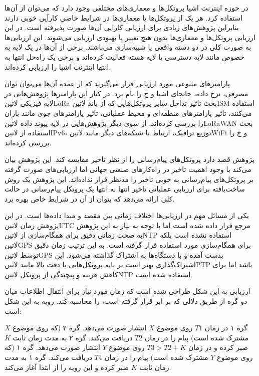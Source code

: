 
در حوزه اینترنت اشیا پروتکل‌ها و معماری‌های مختلفی وجود دارد که می‌توان از آن‌ها استفاده کرد. هر یک از پروتکل‌ها یا معماری‌ها در شرایط خاصی کارآیی خوبی دارند بنابراین پژوهش‌های زیادی برای ارزیابی کارایی آن‌ها صورت پذیرفته است.
در این ارزیابی پروتکل‌ها و معماری‌ها بدون هیچ تغییر یا بهبودی ارزیابی می‌شوند.
این ارزیابی‌ها به صورت کلی در دو دسته واقعی یا شبیه‌سازی می‌باشند. برخی از آن‌ها در یک لایه به خصوص مانند لایه دسترسی یا لایه هسته فعالیت کرده‌اند و برخی یک راه‌حل انتها به انتها اینترنت اشیا را ارزیابی کرده‌اند.

پارامترهای متنوعی مورد ارزیابی قرار می‌گیرند که از عمده آن‌ها می‌توان توان مصرفی، نرخ داده، جابجای اشیا و ‌خ را نام برد.
در کنار این پارامترها پژوهش‌هایی در لایه فیزیکی ‌لاتین{LoRa} بحث تاثیر تداخل سایر پروتکل‌هایی که از باند ‌لاتین{ISM} استفاده می‌کنند، تاثیر پارامترهای منطقه‌ای و محیط عملیاتی، تاثیر پارامتر‌های جوی مانند باران
را بررسی کرده‌اند.
از سوی دیگر پژوهش‌هایی در لایه پیوند داده ‌لاتین{LoRaWAN} بحث استفاده از ‌لاتین{IPv6}، توزیع ترافیک، ارتباط با شبکه‌های دیگر مانند ‌لاتین{WiFi} و ‌خ را بررسی کرده‌اند.


پژوهش  قصد دارد پروتکل‌های پیام‌رسانی را از نظر تاخیر مقایسه کند. این پژوهش بیان می‌کند با وجود اهمیت تاخیر در راه‌کارهای صنعتی جهانی اما ارزیابی‌های صورت گرفته بر
پروتکل‌های پیام‌رسانی به خوبی تاخیر را مدنظر قرار نداده‌اند. این پژوهش یک روش ساخت‌یافته برای ارزیابی عملیاتی تاخیر انتها به انتها یک پروتکل پیام‌رسانی در حالت کلی ارائه می‌دهد که بتوان از آن
در شرایط خاص بهره برد.

یکی از مسائل مهم در ارزیابی‌ها اختلاف زمانی بین مقصد و مبدا داده‌ها است. در این پژوهش زمان ‌لاتین{UTC} مرجع قرار داده شده است اما با توجه به نیاز به این پژوهش به صحت زمانی دقیق
برای همگام‌سازی از ‌لاتین{NTP} استفاده نشده است بلکه ‌لاتین{GPS} برای همگام‌سازی مورد استفاده قرار گرفته است.
به این ترتیب زمان دقیق توسط ‌لاتین{GPS} بدست آمده و با دستگاه‌ها به اشتراک گذاشته می‌شود. این اشتراک‌گذاری بهتر است بر پایه پروتکل‌هایی با دقت بالا مانند ‌لاتین{PTP} باشد اما
برای کاهش هزینه و پیچیدگی از پروتکل ‌لاتین{NTP} استفاده شده است.

ارزیابی به این شکل طراحی شده است که زمان مورد نیاز برای انتقال اطلاعات میان دو گره از طریق دلالی که بر ابر قرار گرفته است، را محاسبه کند.
رویه به این شکل است:

 گره ۱ در زمان $T1$ روی موضوع $X$ انتشار صورت می‌دهد.
 گره ۲ (که روی موضوع $X$ مشترک شده است) پیام را در زمان $T2$ دریافت می‌کند.
 گره ۲ به مدت زمان ثابت $K$ صبر کرده و در زمان $T3>T2+K$ روی موضوع $Y$ انتشار صورت می‌دهد.
 گره ۱ (که روی موضوع $Y$ مشترک شده است) پیام را در زمان $T4$ دریافت می‌کند.
 گره ۱ به مدت زمان ثابت $K$ صبر کرده و این رویه را از ابتدا آغاز می‌کند.

